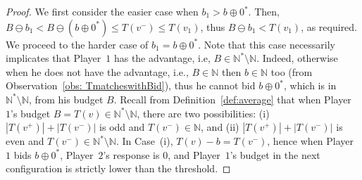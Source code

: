 \documentclass{theoretics}
\newcommand{\PO}{Player~$1$\xspace}
\newcommand{\PT}{Player~$2$\xspace}
\newcommand{\Nat}{\mathbb{N}}
\newcommand{\Natstro}{\mathbb{N}^* \setminus \mathbb{N}}
\newcommand{\succb}[1]{#1 \oplus 0^*\xspace}
\begin{document}
\begin{proof}
We first consider the easier case when \(b_1 > \succb{b}\). Then, \(B \ominus b_1 < B \ominus (\succb{b}) \leq T(v^-) \leq T(v_1)\), thus $B \ominus b_1 < T(v_1)$, as required. We proceed to the harder case of \(b_1 = \succb{b}\). Note that this case necessarily implicates that \PO has the advantage, i.e, \(B \in \Natstro\). 
Indeed, otherwise when he does not have the advantage, i.e., \(B \in \Nat\) then \(b \in \Nat\) too (from Observation~\ref{obs: TmatcheswithBid}), thus he cannot bid \(\succb{b}\), which is in \(\Natstro\), from his budget \(B\). 
Recall from Definition~\ref{def:average} that when \PO's budget \(B = T(v)  \in \Natstro\), there are two possibilities: (i) \(|T(v^+)| + |T(v^-)|\) is odd and \(T(v^-) \in \Nat\), and (ii) \(|T(v^+)| + |T(v^-)|\) is even and \(T(v^-) \in \Natstro\). In Case~(i), \(T(v) - b = T(v^-)\), hence when \PO bids \(\succb{b}\), \PT's response is \(0\), and \PO's budget in the next configuration is strictly lower than the threshold. 


\end{proof}
\end{document}
